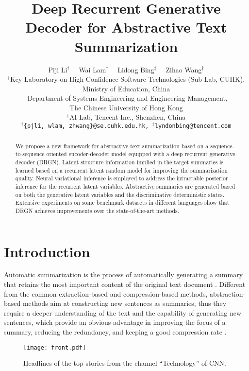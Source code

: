 \documentclass[11pt,letterpaper]{article}
\title{Deep Recurrent Generative Decoder for Abstractive Text Summarization\Thanks{The work described in this paper is supported by a grant from the Grant Council of the Hong Kong Special Administrative Region, China (Project Code: 14203414).}}
\author{ Piji Li$^{\dag}$ \ \ Wai Lam$^{\dag}$ \ \ Lidong Bing$^{\ddag}$ \ \ Zihao Wang$^{\dag}$ \\
		$^{\dag}$Key Laboratory on High Confidence Software Technologies (Sub-Lab, CUHK), \\Ministry of Education, China\\
		$^{\dag}$Department of Systems Engineering and Engineering Management,\\
		The Chinese University of Hong Kong\\
		$^{\ddag}$AI Lab, Tencent Inc., Shenzhen, China\\
		{\tt  $^{\dag}$\{pjli, wlam, zhwang\}@se.cuhk.edu.hk, $^{\ddag}$lyndonbing@tencent.com}}
\date{}
\begin{document}
\maketitle

\begin{abstract}
  We propose a new framework for abstractive text summarization based on a sequence-to-sequence oriented encoder-decoder model equipped with a deep recurrent generative decoder (DRGN).
  Latent structure information implied in the target summaries is learned based on a recurrent latent random model for improving the summarization quality.
  Neural variational inference is employed to address the intractable posterior inference for the recurrent latent variables.
  Abstractive summaries are generated based on both the generative latent variables and the discriminative deterministic states.
  Extensive experiments on some benchmark datasets in different languages show that DRGN achieves improvements over the state-of-the-art methods.
\end{abstract}


\section{Introduction}
\label{sec:1}

Automatic summarization is the process of automatically generating a summary that retains the most important content of the original text document \cite{edmundson1969new,luhn1958automatic,nenkova2012survey}.
Different from the common extraction-based and compression-based methods, abstraction-based methods aim at constructing new sentences as summaries, thus they require a deeper understanding of the text and the capability of generating new sentences, which provide an obvious advantage in improving the focus of a summary, reducing the redundancy, and keeping a good compression rate \cite{lidong15absmds,rush2015neural,nallapati2016abstractive}.

\begin{figure}[!t]
	\centering
	\texttt{[image: front.pdf]}
	\caption{
		Headlines of the top stories from the channel ``Technology'' of CNN.
	}
	\label{fig:front}
\end{figure}
\end{document}

